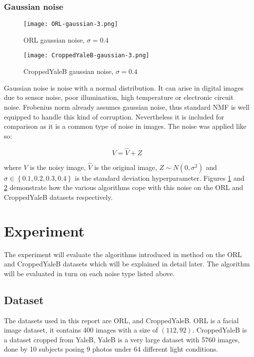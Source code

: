 \documentclass{article} %
\begin{document}
\subsubsection{Gaussian noise}
\begin{figure}
\texttt{[image: ORL-gaussian-3.png]}
\caption{ORL gaussian noise, $\sigma=0.4$ \label{fig:ORL-gaussian-3}}
\end{figure}
\begin{figure}
\texttt{[image: CroppedYaleB-gaussian-3.png]}
\caption{CroppedYaleB gaussian noise, $\sigma=0.4$ \label{fig:CroppedYaleB-gaussian-3}}
\end{figure}

Gaussian noise is noise with a normal distribution. It can arise in digital images due to sensor noise, poor illumination, high temperature or electronic circuit noise. \cite{gaussian} Frobenius norm already assumes gaussian noise, thus standard NMF is well equipped to handle this kind of corruption. Nevertheless it is included for comparison as it is a common type of noise in images. The noise was applied like so:

\begin{equation}
V = \hat{V} + Z
\end{equation}

where $V$ is the noisy image, $\hat{V}$ is the original image, $Z \sim N\left(0,\sigma^2\right)$ and $\sigma \in \left\{0.1,0.2,0.3,0.4\right\}$ is the standard deviation hyperparameter. Figures \ref{fig:ORL-gaussian-3} and \ref{fig:CroppedYaleB-gaussian-3} demonstrate how the various algorithms cope with this noise on the ORL and CroppedYaleB datasets respectively.

\section{Experiment}
The experiment will evaluate the algorithms introduced in method on the ORL and CroppedYaleB datasets which will be explained in detail later. The algorithm will be evaluated in turn on each noise type listed above.

\subsection{Dataset}
The datasets used in this report are ORL, and CroppedYaleB. ORL is a facial image dataset, it contains 400 images with a size of $\left(112,92\right)$. CroppedYaleB is a dataset cropped from YaleB, YaleB is a very large dataset with 5760 images, done by 10 subjects posing 9 photos under 64 different light conditions.
\end{document}
